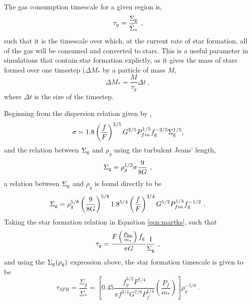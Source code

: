 The gas consumption timescale for a given region is,
\begin{equation}
\label{eqn:gcdef}
\tau_g = \frac{\Sigma_\mathrm{g}}{\dot{\Sigma}_*}~,
\end{equation}
such that it is the timescale over which, at the current rate of star formation, all of the gas will be consumed and converted to stars.
This is a useful parameter in simulations that contain star formation explictly, as it gives the mass of stars formed over one timestep ($\Delta M_*$ by a particle of mass $M$,
$$
\Delta M_* = \frac{M}{\tau_g} \Delta t~,
$$
where $\Delta t$ is the size of the timestep.

Beginning from the dispersion relation given by \citet{martizzi2015},
$$
\sigma = 1.8 \left(\frac{f}{F}\right)^{{3/5}} G^{{2/5}} P_{fin}^{{1/5}} f_\mathrm{g}^{{-2/5}} \Sigma_\mathrm{g}^{{1/5}},
$$
and the relation between $\Sigma_\mathrm{g}$ and $\rho_g$ using the turbulent Jeans' length,
$$
\Sigma_\mathrm{g} = \rho_g^{1/2} \sigma \frac{9}{8G}~,
$$
a relation between $\Sigma_\mathrm{g}$ and $\rho_g$ is found directly to be
\begin{equation}
\label{eqn:sgrhog}
\Sigma_\mathrm{g} = \rho_g^{5/8} \left(\frac{9}{8G}\right)^{5/8} 1.8^{5/4} \left(\frac{f}{F}\right)^{3/4} G^{1/2} P_{fin}^{1/4} f_\mathrm{g}^{-1/2}~.
\end{equation}
Taking the star formation relation in Equation \ref{eqn:martks}, such that
$$
\tau_g = \frac{F\left(\frac{P_\mathrm{fin}}{m_*}\right)f_\mathrm{g}}{\pi G} \frac{1}{\Sigma_\mathrm{g}}~,
$$
and using the $\Sigma_\mathrm{g} ( \rho_g )$ expression above, the star formation timescale is given to be
\begin{equation}
\label{eqn:gc}
\tau_{SFR} = \frac{\Sigma_g}{\dot{\Sigma}_*} = \left[0.45 \frac{f_g^{3/2} F^{7/4}}{\pi f^{3/4} G^{7/8} P_f^{1/4}} \left(\frac{P_{f}}{m_*}\right)\right] \rho_g^{-5/8}~.
\end{equation}



